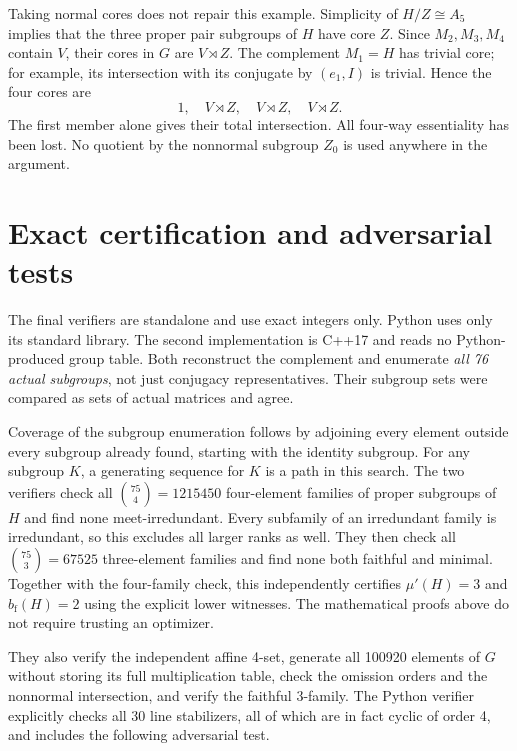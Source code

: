 \documentclass[11pt]{article}
\theoremstyle{remark}\newtheorem{remark}[theorem]{Remark}
\newcommand{\mup}{\mu'}
\newcommand{\bfth}{b_{\mathrm f}}
\begin{document}
Taking normal cores does not repair this example. Simplicity of $H/Z\cong A_5$
implies that the three proper pair subgroups of $H$ have core $Z$. Since
$M_2,M_3,M_4$ contain $V$, their cores in $G$ are $V\rtimes Z$.
The complement $M_1=H$ has trivial core; for example, its intersection with
its conjugate by $(e_1,I)$ is trivial. Hence the four cores are
\[
                   1,\quad V\rtimes Z,\quad V\rtimes Z,\quad V\rtimes Z.
\]
The first member alone gives their total intersection. All four-way
essentiality has been lost. No quotient by the nonnormal subgroup $Z_0$ is
used anywhere in the argument.

\section{Exact certification and adversarial tests}
The final verifiers are standalone and use exact integers only. Python uses
only its standard library. The second implementation is C++17 and reads no
Python-produced group table. Both reconstruct the complement and enumerate
\emph{all 76 actual subgroups}, not just conjugacy representatives. Their
subgroup sets were compared as sets of actual matrices and agree.

Coverage of the subgroup enumeration follows by adjoining every element
outside every subgroup already found, starting with the identity subgroup.
For any subgroup $K$, a generating sequence for $K$ is a path in this search.
The two verifiers check all $\binom{75}{4}=1215450$ four-element families of
proper subgroups of $H$ and find none meet-irredundant. Every subfamily of an
irredundant family is irredundant, so this excludes all larger ranks as well.
They then check all $\binom{75}{3}=67525$ three-element families and find none
both faithful and minimal. Together with the four-family check, this
independently certifies $\mup(H)=3$ and $\bfth(H)=2$ using the explicit lower
witnesses. The mathematical proofs above do not require trusting an optimizer.

They also verify the independent affine 4-set, generate all 100920 elements
of $G$ without storing its full multiplication table, check the omission
orders and the nonnormal intersection, and verify the faithful 3-family.
The Python verifier explicitly checks all 30 line stabilizers, all of which
are in fact cyclic of order 4, and includes the following adversarial test.
\end{document}
